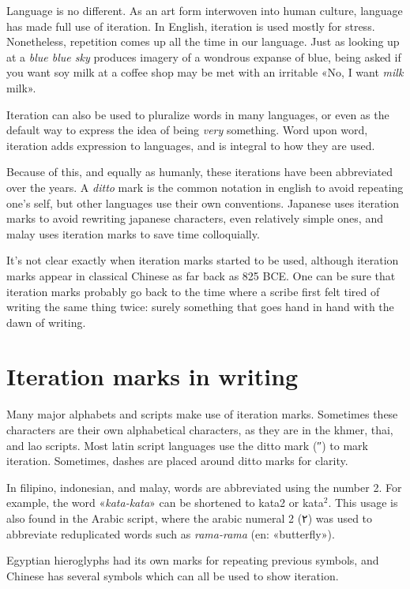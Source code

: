 \documentclass{article}
\newcommand{\h}[1]{$^{#1}$}
\begin{document}
Language is no different. As an art form interwoven into human culture, language
has made full use of iteration. In English, iteration is used mostly for stress.
Nonetheless, repetition comes up all the time in our language. Just as looking
up at a \textit{blue blue sky} produces imagery of a wondrous expanse of blue,
being asked if you want soy milk at a coffee shop may be met with an irritable
«No, I want \textit{milk} milk».

Iteration can also be used to pluralize words in many languages, or even as the
default way to express the idea of being \textit{very} something. Word upon
word, iteration adds expression to languages, and is integral to how they are
used.

Because of this, and equally as humanly, these iterations have been abbreviated
over the years. A \textit{ditto} mark is the common notation in english to avoid
repeating one's self, but other languages use their own conventions. Japanese
uses iteration marks to avoid rewriting japanese characters, even relatively
simple ones, and malay uses iteration marks to save time colloquially.

It's not clear exactly when iteration marks started to be used, although
iteration marks appear in classical Chinese as far back as 825 BCE. One can be
sure that iteration marks probably go back to the time where a scribe first felt
tired of writing the same thing twice: surely something that goes hand in hand
with the dawn of writing.

\section{Iteration marks in writing}

Many major alphabets and scripts make use of iteration marks. Sometimes these
characters are their own alphabetical characters, as they are in the khmer,
thai, and lao scripts. Most latin script languages use the ditto mark (″) to
mark iteration. Sometimes, dashes are placed around ditto marks for clarity.

In filipino, indonesian, and malay, words are abbreviated using the number 2.
For example, the word «\textit{kata-kata}» can be shortened to kata2 or
kata\h{2}. This usage is also found in the Arabic script, where the arabic
numeral 2 (٢‎) was used to abbreviate reduplicated words such as
\textit{rama-rama} (en: «butterfly»).

Egyptian hieroglyphs had its own marks for repeating previous symbols, and
Chinese has several symbols which can all be used to show iteration.
\end{document}
